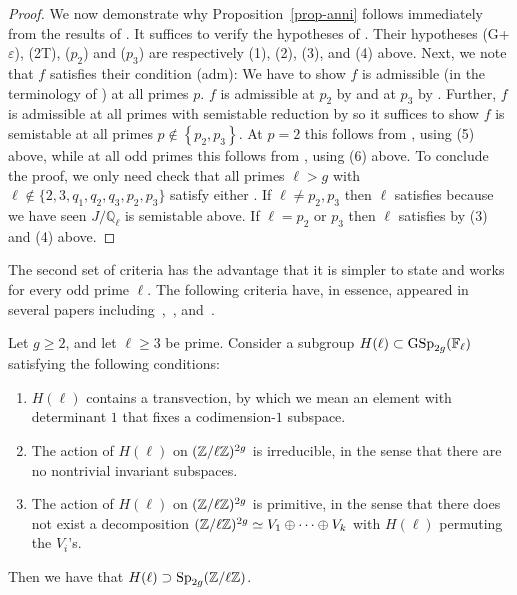 \begin{proof}
	We now demonstrate why Proposition~\ref{prop-anni} follows immediately from the results of \cite{anni2017constructing}.
	It suffices to verify the hypotheses of \cite[Theorem 6.2]{anni2017constructing}.
	Their hypotheses (G+$\varepsilon$), (2T), ($p_2$) and ($p_3$) are respectively (1), (2), (3), and (4) above.
	Next, we note that $f$ satisfies their condition (adm):
	We have to show $f$ is admissible (in the terminology of
	\cite[Definition 4.6]{anni2017constructing}) at all primes $p$.
	$f$ is admissible at $p_2$ by \cite[Lemma 4.10]{anni2017constructing} and at $p_3$ by \cite[Lemma 4.11]{anni2017constructing}.
	Further, $f$ is admissible at all primes with semistable reduction by \cite[Lemma 4.9]{anni2017constructing}
	so it suffices to show $f$ is semistable at all primes $p \notin \left\{ p_2, p_3 \right\}$.
	At $p = 2$ this follows from \cite[Lemma 7.7]{anni2017constructing}, using (5) above, while at
	all odd primes this follows from \cite[Lemma 7.5]{anni2017constructing}, using (6) above.
	To conclude the proof, we only need check that all primes $\ell > g$ with $\ell \not\in \{2,3,q_1, q_2, q_3, p_2, p_3\}$
	satisfy either \cite[Theorem 6.2(i) or (iii)]{anni2017constructing}.
	If $\ell \neq p_2, p_3$ then $\ell$ satisfies \cite[Theorem 6.2(i)]{anni2017constructing} because we have seen $J/\mathbb Q_\ell$
	is semistable above. If $\ell = p_2$ or $p_3$ then $\ell$ satisfies \cite[Theorem 6.2(iii)]{anni2017constructing} by (3) and (4) above.
\end{proof}


The second set of criteria has the advantage that it is simpler to state and works for every odd prime $\ell$.
The following criteria have, in essence, appeared in several papers including~\cite[Theorem 1.1]{renyaDW:classification-of-subgroups-of-symplectic-groups-over-finite-fields},~\cite[Theorem 1.1]{hall:big-symplectic-or-orthogonal-monodromy-modulo-l}, and~\cite[Proposition 2.2]{seaweed}.
\begin{proposition}
	\label{proposition:zywina-criterion}
	Let $g \ge 2$, and let $\ell \ge 3$ be prime. Consider a subgroup $H(\ell) \subset \operatorname{GSp}_{2g}(\mathbb{F}_\ell)$ satisfying the following conditions: 
	\begin{enumerate}
		\item[\customlabel{propa}{(A)}] $H(\ell)$ contains a transvection, by which we mean an element with determinant $1$ that fixes a codimension-$1$ subspace.
		\item[\customlabel{propb}{(B)}] The action of $H(\ell)$ on $(\mathbb Z/\ell \mathbb Z)^{2g}$ is irreducible, in the sense that there are no nontrivial invariant subspaces.
\item[\customlabel{propc}{(C)}] The action of $H(\ell)$ on $(\mathbb Z / \ell \mathbb Z)^{2g}$ is primitive, in the sense that there does not exist a decomposition $(\mathbb Z / \ell \mathbb Z)^{2g} \simeq V_1 \oplus \dots \oplus V_k$ with $H(\ell)$ permuting the $V_i$'s.
	\end{enumerate}
	Then we have that $H(\ell) \supset \operatorname{Sp}_{2g}(\mathbb{Z} / \ell \mathbb Z)$. 
\end{proposition}


